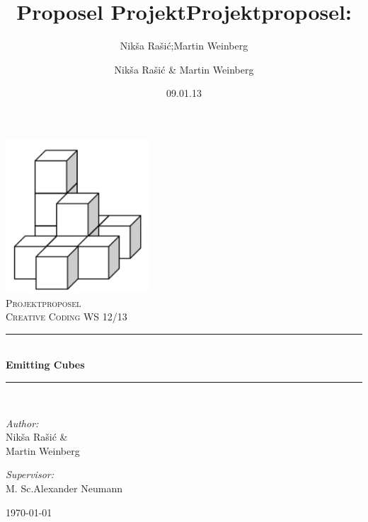 \documentclass[pdftex,12pt,a4paper]{report}
\author{Nik\v{s}a Ra\v{s}i\'{c};Martin Weinberg}
\title{Proposel Projekt}
\newcommand{\HRule}{\rule{\linewidth}{0.5mm}}
\begin{document}
\title{Projektproposel:}
\date{09.01.13}
\author{Nik\v{s}a Ra\v{s}i\'{c} \& Martin Weinberg}

\begin{titlepage}
\begin{center}
\includegraphics[width=0.4\textwidth]{./wuerfel}\\[1cm]    

\textsc{\LARGE Projektproposel}\\[1.5cm]

\textsc{\Large Creative Coding WS 12/13 }\\[0.5cm]


\HRule \\[0.4cm]
{ \huge \bfseries Emitting Cubes}\\[0.4cm]

\HRule \\[1.5cm]

\begin{minipage}{0.4\textwidth}
\begin{flushleft} \large
\emph{Author:}\\
Nik\v{s}a Ra\v{s}i\'{c}  \&  \\ Martin Weinberg
\end{flushleft}
\end{minipage}
\begin{minipage}{0.4\textwidth}
\begin{flushright} \large
\emph{Supervisor:} \\ 
M. Sc.Alexander Neumann 
\end{flushright}
\end{minipage}

\vfill

{\large \today}

\end{center}

\end{titlepage}
\end{document}
